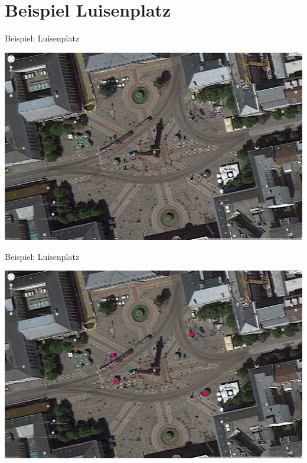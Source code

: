 \documentclass{beamer}
\begin{document}
\section{Beispiel Luisenplatz}
\begin{frame}{Beispiel: Luisenplatz}
\begin{center}
\includegraphics[height=0.7\textheight]{images/map_luisenplatz_1}
\end{center}
\end{frame}

\begin{frame}{Beispiel: Luisenplatz}
\begin{center}
\includegraphics[height=0.7\textheight]{images/map_luisenplatz_2}
\end{center}
\end{frame}
\end{document}
